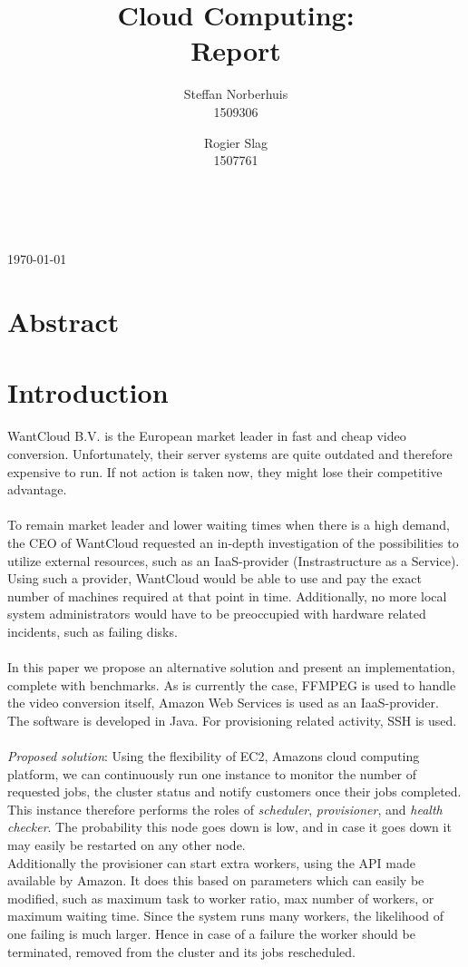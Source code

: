 \documentclass[a4paper]{IEEEtran}
\title{Cloud Computing: \\ Report}
\author{Steffan Norberhuis\\ 1509306 \and
 Rogier Slag\\ 1507761}
\author{
    \IEEEauthorblockN{Steffan Norberhuis, Rogier Slag}\\
    \IEEEauthorblockA{1509306, 1507761}
}
\begin{document}
\maketitle
\begin{center}
\today
\end{center}

\section{Abstract}


\section{Introduction}

WantCloud B.V. is the European market leader in fast and cheap video conversion. Unfortunately, their server systems are quite outdated and therefore expensive to run. If not action is taken now, they might lose their competitive advantage.\\
\\
To remain market leader and lower waiting times when there is a high demand, the CEO of WantCloud requested an in-depth investigation of the possibilities to utilize external resources, such as an IaaS-provider (Instrastructure as a Service). Using such a provider, WantCloud would be able to use and pay the exact number of machines required at that point in time. Additionally, no more local system administrators would have to be preoccupied with hardware related incidents, such as failing disks.\\
\\
In this paper we propose an alternative solution and present an implementation, complete with benchmarks. As is currently the case, FFMPEG is used to handle the video conversion itself, Amazon Web Services is used as an IaaS-provider. The software is developed in Java. For provisioning related activity, SSH is used.\\
\\
\textit{Proposed solution}: Using the flexibility of EC2, Amazons cloud computing platform, we can continuously run one instance to monitor the number of requested jobs, the cluster status and notify customers once their jobs completed. This instance therefore performs the roles of \textit{scheduler}, \textit{provisioner}, and \textit{health checker}. The probability this node goes down is low, and in case it goes down it may easily be restarted on any other node.\\
Additionally the provisioner can start extra workers, using the API made available by Amazon. It does this based on parameters which can easily be modified, such as maximum task to worker ratio, max number of workers, or maximum waiting time. Since the system runs many workers, the likelihood of one failing is much larger. Hence in case of a failure the worker should be terminated, removed from the cluster and its jobs rescheduled.\\
\end{document}
